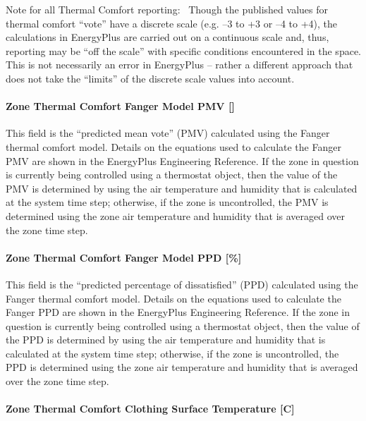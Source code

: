 Note for all Thermal Comfort reporting:~ Though the published values for thermal comfort ``vote'' have a discrete scale (e.g. --3 to +3 or --4 to +4), the calculations in EnergyPlus are carried out on a continuous scale and, thus, reporting may be ``off the scale'' with specific conditions encountered in the space. This is not necessarily an error in EnergyPlus -- rather a different approach that does not take the ``limits'' of the discrete scale values into account.

\paragraph{Zone Thermal Comfort Fanger Model PMV {[]}}\label{zone-thermal-comfort-fanger-model-pmv}

This field is the ``predicted mean vote'' (PMV) calculated using the Fanger thermal comfort model. Details on the equations used to calculate the Fanger PMV are shown in the EnergyPlus Engineering Reference. If the zone in question is currently being controlled using a thermostat object, then the value of the PMV is determined by using the air temperature and humidity that is calculated at the system time step; otherwise, if the zone is uncontrolled, the PMV is determined using the zone air temperature and humidity that is averaged over the zone time step.

\paragraph{Zone Thermal Comfort Fanger Model PPD {[}\%{]}}\label{zone-thermal-comfort-fanger-model-ppd}

This field is the ``predicted percentage of dissatisfied'' (PPD) calculated using the Fanger thermal comfort model.  Details on the equations used to calculate the Fanger PPD are shown in the EnergyPlus Engineering Reference. If the zone in question is currently being controlled using a thermostat object, then the value of the PPD is determined by using the air temperature and humidity that is calculated at the system time step; otherwise, if the zone is uncontrolled, the PPD is determined using the zone air temperature and humidity that is averaged over the zone time step.

\paragraph{Zone Thermal Comfort Clothing Surface Temperature {[}C{]}}\label{zone-thermal-comfort-clothing-surface-temperature-c}

